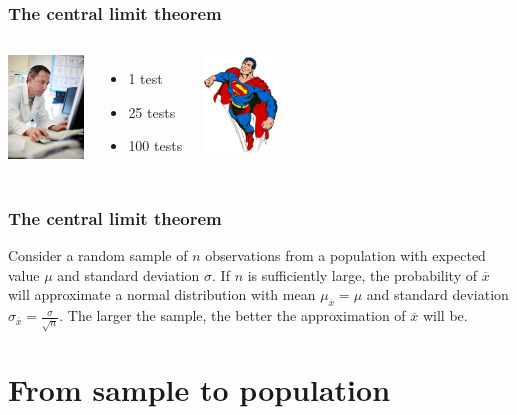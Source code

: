 \documentclass{beamer}
\begin{document}
\begin{frame}
  \frametitle{The central limit theorem}


  \vfill

  \begin{columns}[c]
    \includegraphics[width=2cm]{img/les4-centrlimiet}
    \begin{itemize}
      \item 1 test
      \item 25 tests
      \item 100 tests
    \end{itemize}
    \includegraphics[width=2cm]{img/les2-hero-3}
  \end{columns}

\end{frame}

\begin{frame}
  \frametitle{The central limit theorem}

  Consider a random sample of $n$ observations from a population with expected value $\mu$ and standard deviation $\sigma$. If $n$ is sufficiently large, the probability of $\overline{x}$ will approximate a normal distribution with mean $\mu_{\overline{x}} = \mu$ and standard deviation $\sigma_{\overline{x}} = \frac{\sigma}{\sqrt{n}}$. The larger the sample, the better the approximation of $\overline{x}$ will be.
\end{frame}

\section{From sample to population}
\sectionframelogo{}
\end{document}
